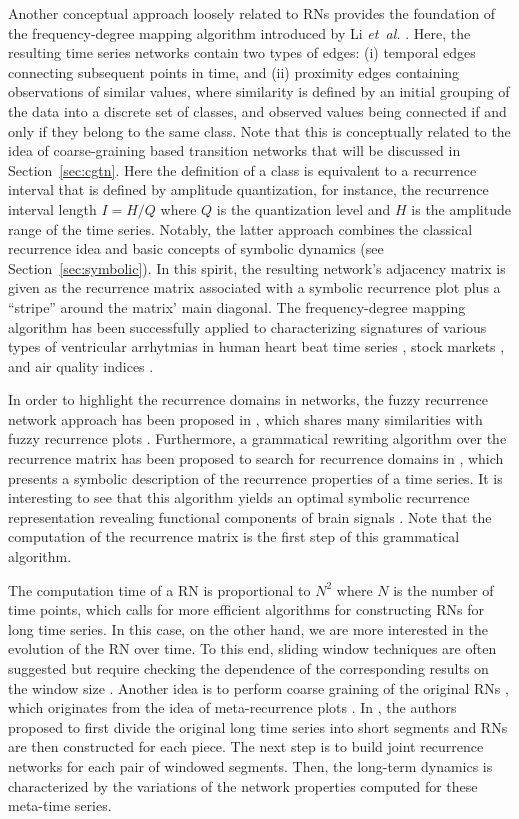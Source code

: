 		Another conceptual approach loosely related to RNs provides the foundation of the frequency-degree mapping algorithm introduced by Li \textit{et~al.} \cite{Li2012}. Here, the resulting time series networks contain two types of edges: (i) temporal edges connecting subsequent points in time, and (ii) proximity edges containing observations of similar values, where similarity is defined by an initial grouping of the data into a discrete set of classes, and observed values being connected if and only if they belong to the same class. Note that this is conceptually related to the idea of coarse-graining based transition networks that will be discussed in Section~\ref{sec:cgtn}. Here the definition of a class is equivalent to a recurrence interval that is defined by amplitude quantization, for instance, the recurrence interval length $I = H/Q$ where $Q$ is the quantization level and $H$ is the amplitude range of the time series. Notably, the latter approach combines the classical recurrence idea and basic concepts of symbolic dynamics \cite{Daw2003} (see Section~\ref{sec:symbolic}). In this spirit, the resulting network's adjacency matrix is given as the recurrence matrix associated with a symbolic recurrence plot \cite{Donner2008,Faure2010,graben2013} plus a ``stripe'' around the matrix' main diagonal. The frequency-degree mapping algorithm has been successfully applied to characterizing signatures of various types of ventricular arrhytmias in human heart beat time series \cite{Li2012}, stock markets \cite{Cao2014}, and air quality indices \cite{Fan2015}.

		In order to highlight the recurrence domains in networks, the fuzzy recurrence network approach has been proposed in \cite{Pham2017}, which shares many similarities with fuzzy recurrence plots \cite{Pham2016}. Furthermore, a grammatical rewriting algorithm over the recurrence matrix has been proposed to search for recurrence domains in \cite{graben2013}, which presents a symbolic description of the recurrence properties of a time series. It is interesting to see that this algorithm yields an optimal symbolic recurrence representation revealing functional components of brain signals \cite{graben2013}. Note that the computation of the recurrence matrix is the first step of this grammatical algorithm.

		The computation time of a RN is proportional to $N^2$ where $N$ is the number of time points, which calls for more efficient algorithms for constructing RNs for long time series. In this case, on the other hand, we are more interested in the evolution of the RN over time. To this end, sliding window techniques are often suggested but require checking the dependence of the corresponding results on the window size \cite{Donges2011a,Donges2011}. Another idea is to perform coarse graining of the original RNs \cite{Costa2018}, which originates from the idea of meta-recurrence plots \cite{casdagli97}. In \cite{Iwayama2012}, the authors proposed to first divide the original long time series into short segments and RNs are then constructed for each piece. The next step is to build joint recurrence networks for each pair of windowed segments. Then, the long-term dynamics is characterized by the variations of the network properties computed for these meta-time series.


